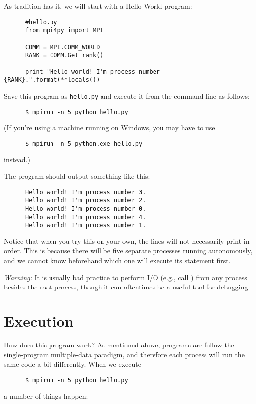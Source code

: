     As tradition has it, we will start with a Hello World program:

    \begin{lstlisting}
      #hello.py
      from mpi4py import MPI

      COMM = MPI.COMM_WORLD
      RANK = COMM.Get_rank()

      print "Hello world! I'm process number {RANK}.".format(**locals())
    \end{lstlisting}

    Save this program as \texttt{hello.py} and execute it from the command line as follows:

    \begin{verbatim}
      $ mpirun -n 5 python hello.py
    \end{verbatim}
    (If you're using a machine running on Windows, you may have to use
    \begin{verbatim}
      $ mpirun -n 5 python.exe hello.py
    \end{verbatim}
    instead.)

    The program should output something like this:

    \begin{lstlisting}
      Hello world! I'm process number 3.
      Hello world! I'm process number 2.
      Hello world! I'm process number 0.
      Hello world! I'm process number 4.
      Hello world! I'm process number 1.
    \end{lstlisting}

    Notice that when you try this on your own, the lines will not necessarily print in order. This is because there will be five separate processes running autonomously, and we cannot know beforehand which one will execute its  statement first.

    \emph{Warning:}
    It is usually bad practice to perform I/O (e.g., call ) from any process besides the root process, though it can oftentimes be a useful tool for debugging.

    \section*{Execution}
    How does this program work? As mentioned above,  programs are follow the single-program multiple-data paradigm, and therefore each process will run the same code a bit differently. When we execute 
    \begin{verbatim}
      $ mpirun -n 5 python hello.py
    \end{verbatim}
    a number of things happen:

